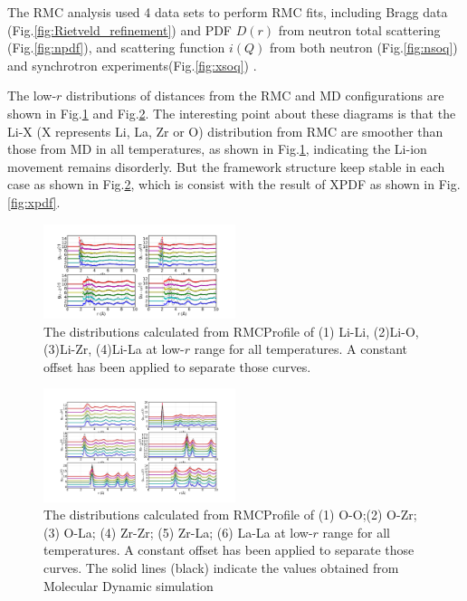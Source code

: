 \documentclass[twoside,twocolumn,9pt]{article}
\begin{document}
 The RMC analysis used 4 data sets to perform RMC fits, including Bragg data (Fig.\ref{fig:Rietveld_refinement}) and PDF $D(r)$ from neutron total scattering (Fig.\ref{fig:npdf}),
 and scattering function $i(Q)$ from both neutron (Fig.\ref{fig:nsoq})  and synchrotron experiments(Fig.\ref{fig:xsoq}) .


The low-$r$  distributions of distances from the RMC and MD configurations are shown in Fig.\ref{fig:partialPDFwithLi} and  Fig.\ref{fig:partialPDFwithoutLi}. The interesting point about these diagrams is that
the Li-X (X represents Li, La, Zr or O) distribution from RMC are smoother than those from MD in all temperatures, as shown in Fig.\ref{fig:partialPDFwithLi}, indicating the Li-ion movement remains  disorderly.
But the framework structure keep stable in each case as shown in Fig.\ref{fig:partialPDFwithoutLi}, which is consist with the result of XPDF as shown in Fig. \ref{fig:xpdf}.




\begin{figure}
\centering
\includegraphics[width=0.5\textwidth]{Pics/partialPDFwithLi.pdf}
\caption{The distributions calculated from RMCProfile of (1) Li-Li, (2)Li-O, (3)Li-Zr, (4)Li-La at low-$r$ range for all temperatures. A constant offset has been applied to separate those curves.}
\label{fig:partialPDFwithLi}
\end{figure}

\begin{figure}
\centering
\includegraphics[width=0.5\textwidth]{Pics/partialPDFwithoutLi.pdf}
\caption{The distributions calculated from RMCProfile of (1) O-O;(2) O-Zr;(3) O-La; (4) Zr-Zr; (5) Zr-La; (6) La-La at low-$r$ range for all temperatures. A constant offset has been applied to separate those curves. The solid lines (black) indicate the values obtained from Molecular Dynamic simulation}
\label{fig:partialPDFwithoutLi}
\end{figure}
\end{document}
